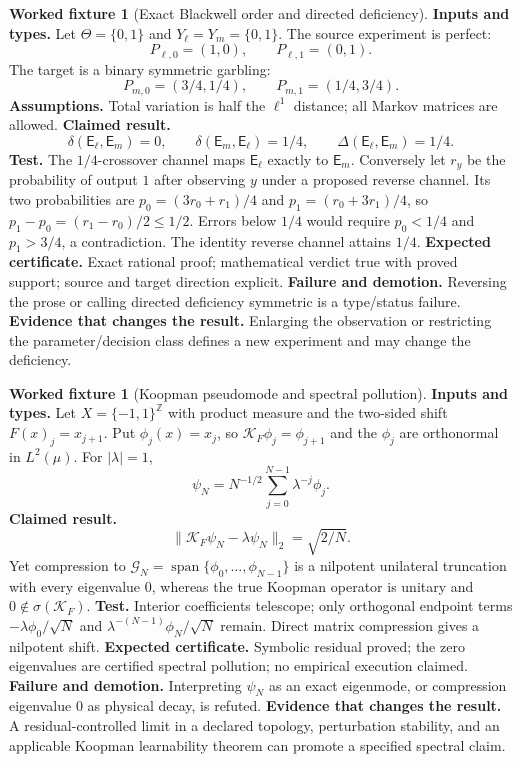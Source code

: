 \documentclass[11pt,a4paper]{article}
\theoremstyle{definition}
\newtheorem{fixture}[definition]{Worked fixture}
\theoremstyle{plain}
\theoremstyle{remark}
\begin{document}
\begin{fixture}[Exact Blackwell order and directed deficiency]
\label{fix:blackwell}
\textbf{Inputs and types.}
Let \(\Theta=\{0,1\}\) and \(Y_\ell=Y_m=\{0,1\}\).  The source experiment is
perfect:
\[
P_{\ell,0}=(1,0),\qquad P_{\ell,1}=(0,1).
\]
The target is a binary symmetric garbling:
\[
P_{m,0}=(3/4,1/4),\qquad P_{m,1}=(1/4,3/4).
\]
\textbf{Assumptions.}  Total variation is half the \(\ell^1\) distance; all
Markov matrices are allowed.
\textbf{Claimed result.}
\[
\delta(\mathsf E_\ell,\mathsf E_m)=0,\qquad
\delta(\mathsf E_m,\mathsf E_\ell)=1/4,\qquad
\Delta(\mathsf E_\ell,\mathsf E_m)=1/4.
\]
\textbf{Test.}  The \(1/4\)-crossover channel maps \(\mathsf E_\ell\) exactly
to \(\mathsf E_m\).  Conversely let \(r_y\) be the probability of output \(1\)
after observing \(y\) under a proposed reverse channel.  Its two probabilities
are \(p_0=(3r_0+r_1)/4\) and \(p_1=(r_0+3r_1)/4\), so
\(p_1-p_0=(r_1-r_0)/2\le1/2\).  Errors below \(1/4\) would require
\(p_0<1/4\) and \(p_1>3/4\), a contradiction.  The identity reverse channel
attains \(1/4\).
\textbf{Expected certificate.}  Exact rational proof; mathematical verdict
true with proved support; source and target direction explicit.
\textbf{Failure and demotion.}  Reversing the prose or calling directed
deficiency symmetric is a type/status failure.
\textbf{Evidence that changes the result.}  Enlarging the observation or
restricting the parameter/decision class defines a new experiment and may
change the deficiency.
\end{fixture}

\begin{fixture}[Koopman pseudomode and spectral pollution]\label{fix:koopman}
\textbf{Inputs and types.}
Let \(X=\{-1,1\}^{\mathbb Z}\) with product measure and the two-sided shift
\(F(x)_j=x_{j+1}\).  Put \(\phi_j(x)=x_j\), so
\(\mathcal K_F\phi_j=\phi_{j+1}\) and the \(\phi_j\) are orthonormal in
\(L^2(\mu)\).  For \(|\lambda|=1\),
\[
\psi_N=N^{-1/2}\sum_{j=0}^{N-1}\lambda^{-j}\phi_j.
\]
\textbf{Claimed result.}
\[
\|\mathcal K_F\psi_N-\lambda\psi_N\|_2=\sqrt{2/N}.
\]
Yet compression to
\(\mathcal G_N=\operatorname{span}\{\phi_0,\ldots,\phi_{N-1}\}\)
is a nilpotent unilateral truncation with every eigenvalue \(0\), whereas the
true Koopman operator is unitary and \(0\notin\sigma(\mathcal K_F)\).
\textbf{Test.}  Interior coefficients telescope; only orthogonal endpoint
terms \(-\lambda\phi_0/\sqrt N\) and
\(\lambda^{-(N-1)}\phi_N/\sqrt N\) remain.  Direct matrix compression gives a
nilpotent shift.
\textbf{Expected certificate.}  Symbolic residual proved; the zero eigenvalues
are certified spectral pollution; no empirical execution claimed.
\textbf{Failure and demotion.}  Interpreting \(\psi_N\) as an exact eigenmode,
or compression eigenvalue \(0\) as physical decay, is refuted.
\textbf{Evidence that changes the result.}  A residual-controlled limit in a
declared topology, perturbation stability, and an applicable Koopman
learnability theorem can promote a specified spectral claim.
\end{fixture}
\end{document}
